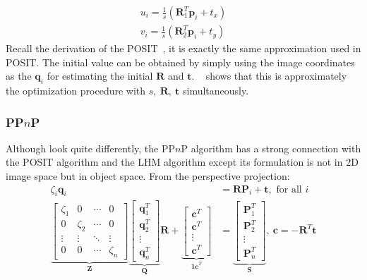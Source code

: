 \documentclass[a4paper]{article}
\begin{document}
\begin{align*}
u_i = \frac{1}{s}(\mathbf{R}_1^T\mathbf{p}_i+t_x) \\
v_i = \frac{1}{s}(\mathbf{R}_2^T\mathbf{p}_i+t_y)
\end{align*}
Recall the derivation of the POSIT~\cite{oberkampf1996iterative}, it is exactly the same approximation used in POSIT. The initial value can be obtained by simply using the image coordinates as the $\mathbf{q}_i$ for estimating the initial $\mathbf{R}$ and $\mathbf{t}$. ~\cite{lu2000fast} shows that this is approximately the optimization procedure with $s,\ \mathbf{R},\ \mathbf{t}$ simultaneously.

\subsubsection{PP$n$P}
Although look quite differently, the PP$n$P algorithm has a strong connection with the POSIT algorithm and the LHM algorithm except its formulation is not in $2$D image space but in object space. From the perspective projection:
\begin{align*}
\zeta_i \mathbf{q}_i &= \mathbf{R}\mathbf{P}_i+\mathbf{t},\text{ for all $i$} \\
\underbrace{
\left[
\begin{matrix}
\zeta_1 & 0 & \cdots & 0 \\
0 & \zeta_2 & \cdots & 0 \\
\vdots & \vdots & \ddots & \vdots \\
0 & 0 & \cdots & \zeta_n
\end{matrix}
\right]}_{\mathbf{Z}}
\underbrace{\left[
\begin{matrix}
\mathbf{q}_1^T \\
\mathbf{q}_2^T \\
\vdots \\
\mathbf{q}_n^T
\end{matrix}
\right]}_{\mathbf{Q}}\mathbf{R}+
\underbrace{\left[
\begin{matrix}
\mathbf{c}^T \\
\mathbf{c}^T \\
\vdots \\
\mathbf{c}^T
\end{matrix}
\right]}_{\mathbf{1c}^T}&=
\underbrace{\left[
\begin{matrix}
\mathbf{P}_1^T \\
\mathbf{P}_2^T \\
\vdots \\
\mathbf{P}_n^T
\end{matrix}
\right]}_{\mathbf{S}},\ \mathbf{c}=-\mathbf{R}^T\mathbf{t}
\end{align*}
\end{document}
